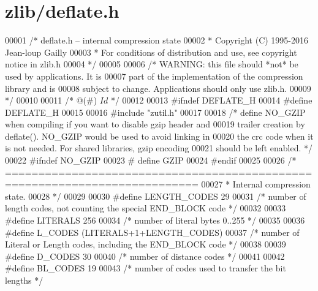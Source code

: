 \hypertarget{zlib_2deflate_8h_source}{}\section{zlib/deflate.h}
\label{zlib_2deflate_8h_source}

\begin{DoxyCode}
00001 \textcolor{comment}{/* deflate.h -- internal compression state}
00002 \textcolor{comment}{ * Copyright (C) 1995-2016 Jean-loup Gailly}
00003 \textcolor{comment}{ * For conditions of distribution and use, see copyright notice in zlib.h}
00004 \textcolor{comment}{ */}
00005 
00006 \textcolor{comment}{/* WARNING: this file should *not* be used by applications. It is}
00007 \textcolor{comment}{   part of the implementation of the compression library and is}
00008 \textcolor{comment}{   subject to change. Applications should only use zlib.h.}
00009 \textcolor{comment}{ */}
00010 
00011 \textcolor{comment}{/* @(#) $Id$ */}
00012 
00013 \textcolor{preprocessor}{#ifndef DEFLATE\_H}
00014 \textcolor{preprocessor}{#define DEFLATE\_H}
00015 
00016 \textcolor{preprocessor}{#include "zutil.h"}
00017 
00018 \textcolor{comment}{/* define NO\_GZIP when compiling if you want to disable gzip header and}
00019 \textcolor{comment}{   trailer creation by deflate().  NO\_GZIP would be used to avoid linking in}
00020 \textcolor{comment}{   the crc code when it is not needed.  For shared libraries, gzip encoding}
00021 \textcolor{comment}{   should be left enabled. */}
00022 \textcolor{preprocessor}{#ifndef NO\_GZIP}
00023 \textcolor{preprocessor}{#  define GZIP}
00024 \textcolor{preprocessor}{#endif}
00025 
00026 \textcolor{comment}{/* ===========================================================================}
00027 \textcolor{comment}{ * Internal compression state.}
00028 \textcolor{comment}{ */}
00029 
00030 \textcolor{preprocessor}{#define LENGTH\_CODES 29}
00031 \textcolor{comment}{/* number of length codes, not counting the special END\_BLOCK code */}
00032 
00033 \textcolor{preprocessor}{#define LITERALS  256}
00034 \textcolor{comment}{/* number of literal bytes 0..255 */}
00035 
00036 \textcolor{preprocessor}{#define L\_CODES (LITERALS+1+LENGTH\_CODES)}
00037 \textcolor{comment}{/* number of Literal or Length codes, including the END\_BLOCK code */}
00038 
00039 \textcolor{preprocessor}{#define D\_CODES   30}
00040 \textcolor{comment}{/* number of distance codes */}
00041 
00042 \textcolor{preprocessor}{#define BL\_CODES  19}
00043 \textcolor{comment}{/* number of codes used to transfer the bit lengths */}

\end{DoxyCode}
